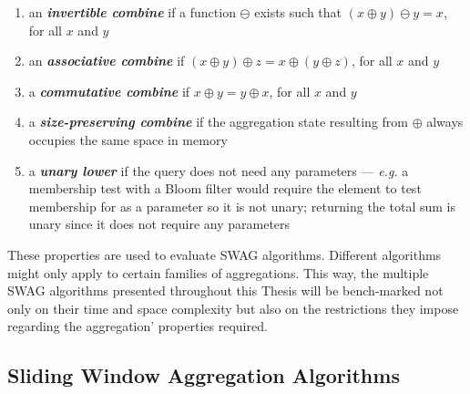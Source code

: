 \begin{enumerate}
    \item  an \textbf{\textit{invertible combine}} if a function $\ominus$ exists such that $(x \oplus y) \ominus y = x$, for all $x$ and $y$
    
    \item  an \textbf{\textit{associative combine}} if $(x \oplus y) \oplus z = x \oplus (y \oplus z)$, for all $x$ and $y$
    
    \item  a \textbf{\textit{commutative combine}} if $x \oplus y = y \oplus x$, for all $x$ and $y$
    
    \item  a \textbf{\textit{size-preserving combine}} if the aggregation state resulting from $\oplus$ always occupies the same space in memory
   
    \item  a \textbf{\textit{unary lower}} if the query does not need any parameters --- \textit{e.g.} a membership test with a Bloom filter would require the element to test membership for as a parameter so it is not unary; returning the total sum is unary since it does not require any parameters
\end{enumerate}

These properties are used to evaluate SWAG algorithms. Different algorithms might only apply to certain families of aggregations. This way, the multiple SWAG algorithms presented throughout this Thesis will be bench-marked not only on their time and space complexity but also on the restrictions they impose regarding the aggregation' properties required.


\subsection{Sliding Window Aggregation Algorithms}


